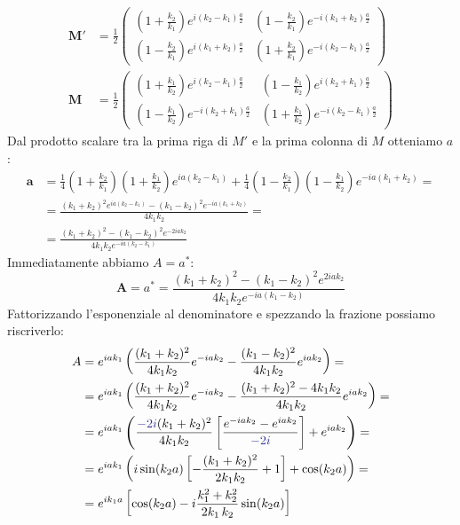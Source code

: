 \documentclass[../../FisicaTeorica.tex]{subfiles}
\begin{document}
\begin{align}
\bm{M'} &= \frac{1}{2} \begin{pmatrix}
\left(1+\frac{k_2}{k_1}\right) e^{i(k_2-k_1)\frac{a}{2}} & \left(1-\frac{k_2}{k_1}\right)e^{-i(k_1+k_2)\frac{a}{2}}\\
\left(1-\frac{k_2}{k_1}\right)e^{i(k_1+k_2)\frac{a}{2}}&
\left(1+\frac{k_2}{k_1}\right)e^{-i(k_2-k_1)\frac{a}{2}}
\end{pmatrix}
\label{eqn:matrixM1prime}
\\
\bm{M}&=\frac{1}{2}\begin{pmatrix}
\left(1+\frac{k_1}{k_2}\right)e^{i(k_2-k_1)\frac{a}{2}} & \left (
1-\frac{k_1}{k_2}
\right)
e^{i(k_2+k_1)\frac{a}{2}}\\
\left(1-\frac{k_1}{k_2}\right)e^{-i(k_2+k_1)\frac{a}{2}} & \left(1+\frac{k_1}{k_2}\right)e^{-i(k_2-k_1)\frac{a}{2}}
\end{pmatrix}
\label{eqn:matrixM1}
\end{align} 
Dal prodotto scalare tra la prima riga di $M'$ e la prima colonna di $M$ otteniamo $a$:
\begin{align}\nonumber
\bm{a}&=\frac{1}{4}\left(1+\frac{k_2}{k_1}\right)\left(1+\frac{k_1}{k_2}\right)e^{ia(k_2-k_1)}+\frac{1}{4}\left(1-\frac{k_2}{k_1}\right)\left(1-\frac{k_1}{k_2}\right)e^{-ia(k_1+k_2)}=\\ \nonumber
&=\frac{(k_1+k_2)^2 e^{ia(k_2-k_1)}-(k_1-k_2)^2e^{-ia(k_1+k_2)}}{4k_1 k_2} =\\ 
&=\frac{(k_1+k_2)^2 - (k_1-k_2)^2 e^{-2iak_2}}{4k_1 k_2 e^{-ia(k_2-k_1)}}
\label{eqn:matrix_alpha}
\end{align}
Immediatamente abbiamo $A=a^*$:
\[
\bm{A}=a^*=\frac{(k_1+k_2)^2-(k_1-k_2)^2 e^{2iak_2}}{4k_1 k_2 e^{-ia(k_1-k_2)}}
\]
Fattorizzando l'esponenziale al denominatore e spezzando la frazione possiamo riscriverlo:
\begin{align}\nonumber
A&=e^{iak_1}\left( \frac{(k_1+k_2)^2}{4k_1 k_2}e^{-iak_2} - \frac{(k_1-k_2)^2}{4k_1 k_2}e^{iak_2}\right) =\\\nonumber
&=e^{iak_1}\left(\frac{(k_1+k_2)^2}{4k_1 k_2} e^{-iak_2}-\frac{(k_1+k_2)^2-4k_1k_2}{4k_1k_2}e^{iak_2}\right)=\\\nonumber
&=e^{iak_1}\left(\frac{\textcolor{Blue}{-2i}(k_1+k_2)^2}{4k_1k_2}\left[\frac{e^{-iak_2}-e^{iak_2}}{\textcolor{Blue}{-2i}}\right] + e^{iak_2} \right)=\\\nonumber
&=e^{iak_1}\left(
i\sin(k_2 a) \left[-\frac{(k_1+k_2)^2}{2k_1 k_2}+1\right] + \cos(k_2 a)\right) =\\
&= e^{ik_1 a}\left[
\cos (k_2 a) -i\frac{k_1^2+k_2^2}{2k_1\,k_2}\sin (k_2 a) \right]
\label{eqn:matrix_alpha_coniugato}
\end{align}
\end{document}
